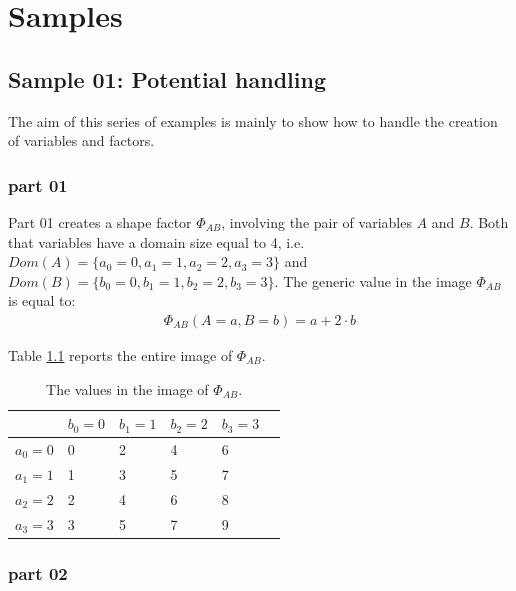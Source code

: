 \newpage
\chapter{Samples}
\label{chap:Samples}

\section{Sample 01: Potential handling}

The aim of this series of examples is mainly to show how to handle the creation of variables and factors.

\subsection{part 01}

Part 01 creates a shape factor $\Phi_{AB}$, involving the pair of variables $A$ and $B$. Both that variables have a domain size equal to 4, i.e. $Dom(A) = \lbrace a_0 = 0, a_1 =1 , a_2=2, a_3=3 \rbrace$ and  $Dom(B) = \lbrace b_0=0, b_1=1, b_2=2, b_3=3 \rbrace$.
The generic value in the image $\Phi_{AB}$ is equal to:
\begin{eqnarray}
 \Phi_{AB}(A = a, B= b) = a + 2 \cdot b
\end{eqnarray} 

Table \ref{tab:S_1:t1} reports the entire image of $\Phi_{AB}$.

\begin{table}[]
\centering
\begin{tabular}{l|l|l|l|l|l|}
      & $b_0 = 0$ & $b_1 = 1$ & $b_2 = 2$ & $b_3= 3$ \\
      \hline
$a_0 = 0$ & 0     & 2     & 4     & 6     \\
\hline
$a_1 = 1$ & 1     & 3     & 5     & 7     \\
\hline
$a_2 = 2$ & 2     & 4     & 6     & 8     \\
\hline 
$a_3 = 3$ & 3     & 5     & 7     & 9     \\
\hline 
\end{tabular}
\caption{The values in the image of $\Phi _{AB}$.} 
\label{tab:S_1:t1}
\end{table}

\subsection{part 02}

